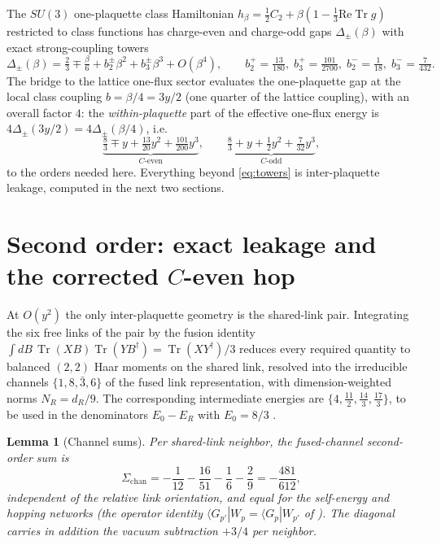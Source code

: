 \documentclass[11pt]{article}
\newtheorem{lemma}[theorem]{Lemma}
\newcommand{\Tr}{\operatorname{Tr}}
\newcommand{\bra}[1]{\langle #1|}
\begin{document}
The $SU(3)$ one-plaquette class Hamiltonian
$h_\beta=\tfrac12 C_2+\beta(1-\tfrac13\mathrm{Re}\Tr g)$ restricted to class
functions has charge-even and charge-odd gaps $\Delta_\pm(\beta)$ with exact
strong-coupling towers \cite{companion}
\begin{equation}
\Delta_\pm(\beta)=\tfrac23 \mp \tfrac{\beta}{6}
+ b_2^\pm\beta^2 + b_3^\pm\beta^3 + O(\beta^4),
\qquad
b_2^+=\tfrac{13}{180},\; b_3^+=\tfrac{101}{2700},\;
b_2^-=\tfrac{1}{18},\; b_3^-=\tfrac{7}{432}.
\end{equation}
The bridge to the lattice one-flux sector evaluates the one-plaquette gap at the
local class coupling $b=\beta/4=3y/2$ (one quarter of the lattice coupling), with
an overall factor $4$: the \emph{within-plaquette} part of
the effective one-flux energy is $4\Delta_\pm(3y/2)=4\Delta_\pm(\beta/4)$, i.e.
\begin{equation}
\underbrace{\tfrac83 \mp y + \tfrac{13}{20}y^2 + \tfrac{101}{200}y^3}_{C\text{-even}},
\qquad
\underbrace{\tfrac83 + y + \tfrac12 y^2 + \tfrac{7}{32}y^3}_{C\text{-odd}},
\label{eq:towers}
\end{equation}
to the orders needed here. Everything beyond \eqref{eq:towers} is
inter-plaquette leakage, computed in the next two sections.

\section{Second order: exact leakage and the corrected $C$-even hop}
\label{sec:leakage}

At $O(y^2)$ the only inter-plaquette geometry is the shared-link pair.
Integrating the six free links of the pair by the fusion identity
$\int dB\,\Tr(XB)\Tr(YB^\dagger)=\Tr(XY^\dagger)/3$ reduces every required
quantity to balanced $(2,2)$ Haar moments on the shared link, resolved into
the irreducible channels $\{1,8,\bar3,6\}$ of the fused link representation,
with dimension-weighted norms $N_R=d_R/9$. The corresponding intermediate
energies are $\{4,\tfrac{11}{2},\tfrac{14}{3},\tfrac{17}{3}\}$, to be used
in the denominators $E_0-E_R$ with $E_0=8/3$ \cite{companion}.

\begin{lemma}[Channel sums]\label{lem:channels}
Per shared-link neighbor, the fused-channel second-order sum is
\begin{equation}
\Sigma_{\mathrm{chan}}
=-\frac{1}{12}-\frac{16}{51}-\frac16-\frac29=-\frac{481}{612},
\end{equation}
independent of the relative link orientation, and equal for the self-energy
and hopping networks (the operator identity
$\bra{G_{p'}}W_p=\bra{G_p}W_{p'}$ of \cite{companion}). The diagonal carries
in addition the vacuum subtraction $+3/4$ per neighbor.
\end{lemma}
\end{document}
